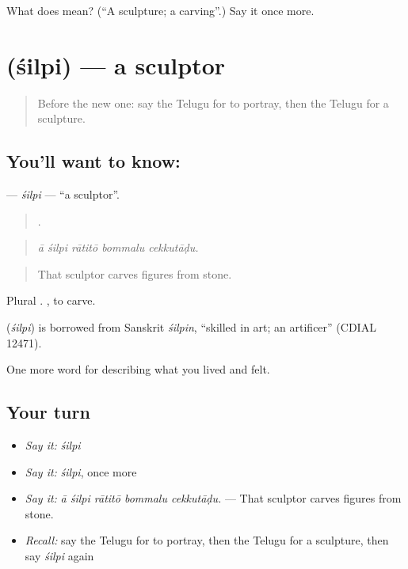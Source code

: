 \begin{tcolorbox}[breakable,colback=teal!4,colframe=teal!35!black,title={Before you move on}]
What does  mean? (\textquotedblleft{}A sculpture; a carving\textquotedblright{}.) Say it once more.
\end{tcolorbox}
\section[\texorpdfstring{\te{శిల్పి} (śilpi)}{శిల్పి (śilpi)}]{ (śilpi) — a sculptor}

\label{lesson:TE-C542-silpi}



\begin{quote}
Before the new one: say the Telugu for to portray, then the Telugu for a sculpture.
\end{quote}

\subsection*{You'll want to know: }
\textbf{} — \emph{śilpi} — \textquotedblleft{}a sculptor\textquotedblright{}.

\begin{quote}
    .
\end{quote}

\begin{quote}
\emph{ā śilpi rātitō bommalu cekkutāḍu.}
\end{quote}

\begin{quote}
That sculptor carves figures from stone.
\end{quote}

Plural . , to carve.

\begin{cousinweb}
\textbf{} (\emph{śilpi}) is borrowed from Sanskrit \emph{śilpin}, \textquotedblleft{}skilled in art; an artificer\textquotedblright{} (CDIAL 12471).
\end{cousinweb}

\begin{grammarlens}[title={What you've built}]
One more word for describing what you lived and felt.
\end{grammarlens}

\subsection*{Your turn}
\begin{itemize}
\raggedright
  \item \emph{Say it:} \emph{śilpi}
  \item \emph{Say it:} \emph{śilpi}, once more
  \item \emph{Say it:} \emph{ā śilpi rātitō bommalu cekkutāḍu.} — That sculptor carves figures from stone.
  \item \emph{Recall:} say the Telugu for to portray, then the Telugu for a sculpture, then say \emph{śilpi} again
\end{itemize}


